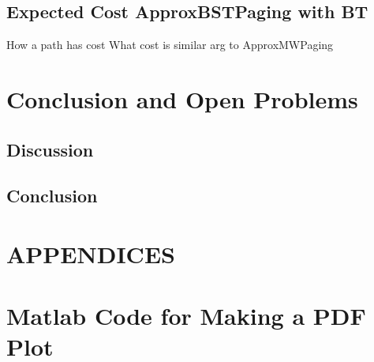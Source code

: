 \documentclass[letterpaper,12pt,titlepage,oneside,final]{book}
\theoremstyle{plain}
\let\origdoublepage\cleardoublepage
\newcommand{\clearemptydoublepage}{%
  \clearpage{\pagestyle{empty}\origdoublepage}}
\let\cleardoublepage\clearemptydoublepage
\begin{document}
\section{Expected Cost ApproxBSTPaging with BT}
How a path has cost
What cost is
similar arg to ApproxMWPaging

\chapter{Conclusion and Open Problems}

\section{Discussion}

\section{Conclusion}



\appendix

\chapter*{APPENDICES}
\chapter[PDF Plots From Matlab]{Matlab Code for Making a PDF Plot}
\label{AppendixA}





\cleardoublepage %
\renewcommand*{\bibname}{References}
\end{document}
